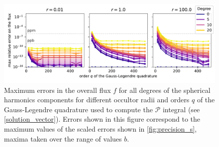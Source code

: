 \documentclass[modern]{aastex631}
\begin{document}
\begin{figure}[H]
    \begin{center}
        \includegraphics[width=\textwidth]{../workflows/figures/error_order_degree.pdf}
        \caption{Maximum errors in the overall flux $f$ for all degrees of the spherical harmonics components for different occultor radii and orders $q$ of the Gauss-Legendre quadrature used to compute the $\mathcal{P}$ integral (see \autoref{solution_vector}). Errors shown in this figure correspond to the maximum values of the scaled errors shown in \autoref{fig:precision_s}, maxima taken over the range of values $b$. }
        \label{fig:precision_order_gausslegendre_degree}
    \end{center}
\end{figure}
\end{document}
